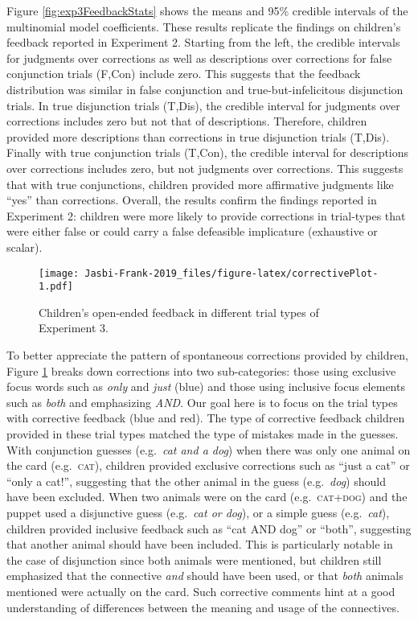 \documentclass[
  english,
  ,man,floatsintext]{apa6}
\begin{document}
Figure \ref{fig:exp3FeedbackStats} shows the means and 95\% credible intervals of the multinomial model coefficients. These results replicate the findings on children's feedback reported in Experiment 2. Starting from the left, the credible intervals for judgments over corrections as well as descriptions over corrections for false conjunction trials (F,Con) include zero. This suggests that the feedback distribution was similar in false conjunction and true-but-infelicitous disjunction trials. In true disjunction trials (T,Dis), the credible interval for judgments over corrections includes zero but not that of descriptions. Therefore, children provided more descriptions than corrections in true disjunction trials (T,Dis). Finally with true conjunction trials (T,Con), the credible interval for descriptions over corrections includes zero, but not judgments over corrections. This suggests that with true conjunctions, children provided more affirmative judgments like \enquote{yes} than corrections. Overall, the results confirm the findings reported in Experiment 2: children were more likely to provide corrections in trial-types that were either false or could carry a false defeasible implicature (exhaustive or scalar).

\begin{figure}
\centering
\texttt{[image: Jasbi-Frank-2019\_files/figure-latex/correctivePlot-1.pdf]}
\caption{\label{fig:correctivePlot}Children's open-ended feedback in different trial types of Experiment 3.}
\end{figure}

To better appreciate the pattern of spontaneous corrections provided by children, Figure \ref{fig:correctivePlot} breaks down corrections into two sub-categories: those using exclusive focus words such as \emph{only} and \emph{just} (blue) and those using inclusive focus elements such as \emph{both} and emphasizing \emph{AND}. Our goal here is to focus on the trial types with corrective feedback (blue and red). The type of corrective feedback children provided in these trial types matched the type of mistakes made in the guesses. With conjunction guesses (e.g.~\emph{cat and a dog}) when there was only one animal on the card (e.g.~\textsc{cat}), children provided exclusive corrections such as \enquote{just a cat} or \enquote{only a cat!}, suggesting that the other animal in the guess (e.g.~\emph{dog}) should have been excluded. When two animals were on the card (e.g.~\textsc{cat+dog}) and the puppet used a disjunctive guess (e.g.~\emph{cat or dog}), or a simple guess (e.g.~\emph{cat}), children provided inclusive feedback such as \enquote{cat AND dog} or \enquote{both}, suggesting that another animal should have been included. This is particularly notable in the case of disjunction since both animals were mentioned, but children still emphasized that the connective \emph{and} should have been used, or that \emph{both} animals mentioned were actually on the card. Such corrective comments hint at a good understanding of differences between the meaning and usage of the connectives.
\end{document}
